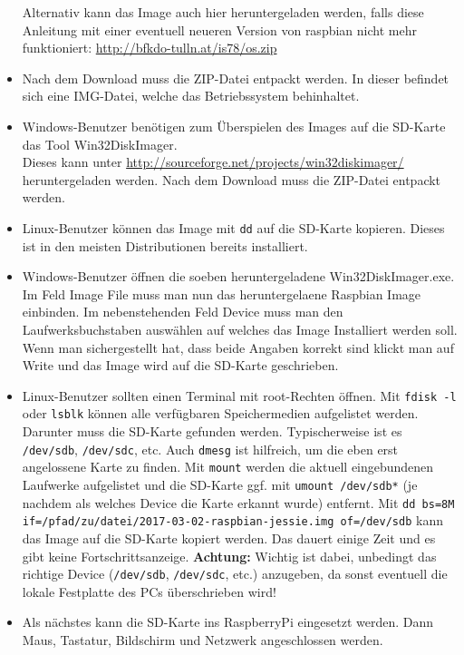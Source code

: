 \begin{itemize}
{		Alternativ kann das Image auch hier heruntergeladen werden, falls diese Anleitung mit einer eventuell neueren Version von raspbian nicht mehr funktioniert: \url{http://bfkdo-tulln.at/is78/os.zip}
		}
	\item {Nach dem Download muss die ZIP-Datei entpackt werden. In dieser befindet sich eine IMG-Datei, welche das Betriebssystem behinhaltet.}
	\item {Windows-Benutzer benötigen zum Überspielen des Images auf die SD-Karte das Tool Win32DiskImager.\\
		Dieses kann unter \url{http://sourceforge.net/projects/win32diskimager/} heruntergeladen werden. 
		Nach dem Download muss die ZIP-Datei entpackt werden.
		}
	\item {Linux-Benutzer können das Image mit \lstinline|dd| auf die SD-Karte kopieren. Dieses ist in den meisten Distributionen bereits installiert.
		}
	\item {Windows-Benutzer öffnen die soeben heruntergeladene Win32DiskImager.exe. Im Feld Image File muss man nun das heruntergelaene Raspbian Image einbinden. 
		Im nebenstehenden Feld Device muss man den Laufwerksbuchstaben auswählen auf welches das Image Installiert werden soll. 
		Wenn man sichergestellt hat, dass beide Angaben korrekt sind klickt man auf Write und das Image wird auf die SD-Karte geschrieben.
		}
	\item {Linux-Benutzer sollten einen Terminal mit root-Rechten öffnen. 
		Mit \lstinline|fdisk -l| oder \lstinline|lsblk| können alle verfügbaren Speichermedien aufgelistet werden. Darunter muss die SD-Karte gefunden werden.
		Typischerweise ist es \lstinline|/dev/sdb|, \lstinline|/dev/sdc|, etc.
		Auch \lstinline|dmesg| ist hilfreich, um die eben erst angelossene Karte zu finden. 
		Mit \lstinline|mount| werden die aktuell eingebundenen Laufwerke aufgelistet und 
		die SD-Karte ggf. mit \lstinline|umount /dev/sdb*| (je nachdem als welches Device die Karte erkannt wurde) entfernt.
		Mit \lstinline|dd bs=8M if=/pfad/zu/datei/2017-03-02-raspbian-jessie.img of=/dev/sdb| kann das Image auf die SD-Karte kopiert werden.
		Das dauert einige Zeit und es gibt keine Fortschrittsanzeige.
		\textbf{Achtung:} Wichtig ist dabei, unbedingt das richtige Device (\lstinline|/dev/sdb|, \lstinline|/dev/sdc|, etc.) anzugeben, 
		da sonst eventuell die lokale Festplatte des PCs überschrieben wird!
		}
	\item {Als nächstes kann die SD-Karte ins RaspberryPi eingesetzt werden. Dann Maus, Tastatur, Bildschirm und Netzwerk angeschlossen werden. 
}
\end{itemize}
